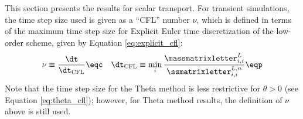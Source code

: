 This section presents the results for scalar transport.
For transient simulations, the time step size used is given as a
``CFL'' number $\nu$, which is defined in terms of the maximum
time step size for Explicit Euler time discretization of the
low-order scheme, given by Equation \eqref{eq:explicit_cfl}:
\begin{equation}
  \nu \equiv \frac{\dt}{\dt_{\textup{CFL}}} \eqc \quad
  \dt_{\textup{CFL}} \equiv \min\limits_i
    \frac{\massmatrixletter_{i,i}^{L}}{\ssmatrixletter_{i,i}^{L,n}}
  \eqp
\end{equation}
Note that the time step size for the Theta method is less
restrictive for $\theta > 0$ (see Equation \eqref{eq:theta_cfl});
however, for Theta method results, the definition of $\nu$ above is
still used.
